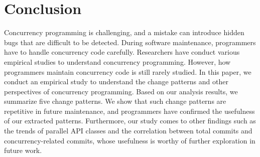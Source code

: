 \section{Conclusion}
Concurrency programming is challenging, and a mistake can introduce hidden bugs that are difficult to be detected. During software maintenance, programmers have to handle concurrency code carefully. Researchers have conduct various empirical studies to understand concurrency programming. However, how programmers maintain concurrency code is still rarely studied. In this paper, we conduct an empirical study to understand the change patterns and other perspectives of concurrency programming. Based on our analysis results, we summarize five change patterns. We show that such change patterns are repetitive in future maintenance, and programmers have confirmed the usefulness of our extracted patterns. Furthermore, our study comes to other findings such as the trends of parallel API classes and the correlation between total commits and concurrency-related commits, whose usefulness is worthy of further exploration in future work. 
